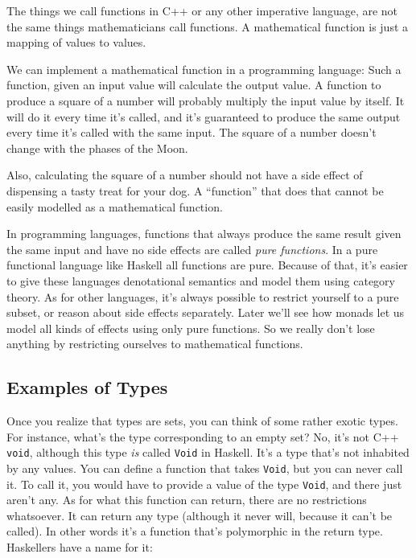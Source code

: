 The things we call functions in C++ or any other imperative language,
are not the same things mathematicians call functions. A mathematical
function is just a mapping of values to values.

We can implement a mathematical function in a programming language: Such
a function, given an input value will calculate the output value. A
function to produce a square of a number will probably multiply the
input value by itself. It will do it every time it's called, and it's
guaranteed to produce the same output every time it's called with the
same input. The square of a number doesn't change with the phases of the
Moon.

Also, calculating the square of a number should not have a side effect
of dispensing a tasty treat for your dog. A ``function'' that does that
cannot be easily modelled as a mathematical function.

In programming languages, functions that always produce the same result
given the same input and have no side effects are called \emph{pure
functions}. In a pure functional language like Haskell all functions are
pure. Because of that, it's easier to give these languages denotational
semantics and model them using category theory. As for other languages,
it's always possible to restrict yourself to a pure subset, or reason
about side effects separately. Later we'll see how monads let us model
all kinds of effects using only pure functions. So we really don't lose
anything by restricting ourselves to mathematical functions.

\subsection{Examples of Types}\label{examples-of-types}

Once you realize that types are sets, you can think of some rather
exotic types. For instance, what's the type corresponding to an empty
set? No, it's not C++ \texttt{void}, although this type \emph{is} called
\texttt{Void} in Haskell. It's a type that's not inhabited by any
values. You can define a function that takes \texttt{Void}, but you can
never call it. To call it, you would have to provide a value of the type
\texttt{Void}, and there just aren't any. As for what this function can
return, there are no restrictions whatsoever. It can return any type
(although it never will, because it can't be called). In other words
it's a function that's polymorphic in the return type. Haskellers have a
name for it:

